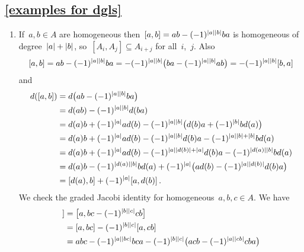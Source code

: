\documentclass[a4paper,10pt,headings=standardclasses]{scrartcl}
\begin{document}
\subsection{\cref{examples for dgls}}
\label{examples for dgls proof}

\begin{enumerate}
  \item
    If~$a, b \in A$ are homogeneous then~$[a,b] = ab - (-1)^{\lvert a\rvert \lvert b\rvert} ba$ is homogeneous of degree~$\lvert a\rvert + \lvert b\rvert$, so~$[A_i, A_j] \subseteq A_{i+j}$ for all~$i$,~$j$.
    Also
    \[
      [a,b]
      =
      ab - (-1)^{\lvert a\rvert \lvert b\rvert} ba
      =
      -(-1)^{\lvert a\rvert \lvert b\rvert} \bigl( ba - (-1)^{\lvert a\rvert \lvert b\rvert} ab \bigr)
      =
      -(-1)^{\lvert a\rvert \lvert b\rvert} [b,a]
    \]
    and
    \begingroup
    \allowdisplaybreaks
    \begin{align*}
      d([a,b])
      &=
      d\bigl( ab - (-1)^{\lvert a\rvert \lvert b\rvert} ba \bigr)
      \\
      &=
      d(ab) - (-1)^{\lvert a\rvert \lvert b\rvert} d(ba)
      \\
      &=
        d(a) b
      + (-1)^{\lvert a\rvert} a d(b)
      - (-1)^{\lvert a\rvert \lvert b\rvert} \bigl( d(b) a + (-1)^{\lvert b\rvert} b d(a) \bigr)
      \\
      &=
        d(a) b
      + (-1)^{\lvert a\rvert} a d(b)
      - (-1)^{\lvert a\rvert \lvert b\rvert} d(b) a
      - (-1)^{\lvert a\rvert \lvert b\rvert + \lvert b\rvert} b d(a)
      \\
      &=
        d(a) b
      + (-1)^{\lvert a\rvert} a d(b)
      - (-1)^{\lvert a\rvert \lvert d(b)\rvert + \lvert a\rvert} d(b) a
      - (-1)^{\lvert d(a)\rvert \lvert b\rvert} b d(a)
      \\
      &=
        d(a) b - (-1)^{\lvert d(a)\rvert \lvert b\rvert} b d(a)
      + (-1)^{\lvert a\rvert} \bigl( a d(b) - (-1)^{\lvert a\rvert \lvert d(b)\rvert} d(b) a \bigr)
      \\
      &=
      [d(a), b] + (-1)^{\lvert a\rvert} [a, d(b)] \,.
    \end{align*}
    \endgroup
    We check the graded Jacobi identity for homogeneous~$a, b, c \in A$.
    We have
    \begingroup
    \allowdisplaybreaks
    \begin{align*}
      [a,[b,c]]
      &=
      \bigl[ a, bc - (-1)^{\hdeg{b} \hdeg{c}} cb \bigr]
      \\
      &=
      [a, bc] - (-1)^{\hdeg{b} \hdeg{c}} [a, cb]
      \\
      &=
        abc - (-1)^{\hdeg{a} \hdeg{bc}} bca
      - (-1)^{\hdeg{b} \hdeg{c}} \bigl( acb - (-1)^{\hdeg{a} \hdeg{cb}} cba \bigr)
      \\

\end{align*}
\end{enumerate}
\end{document}
